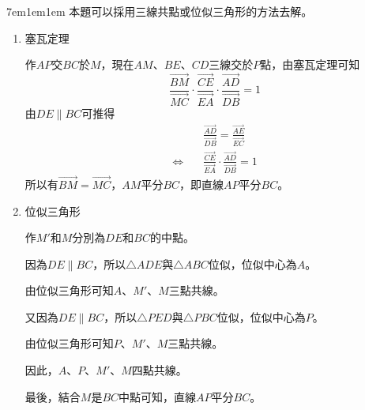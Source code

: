 \documentclass[12pt]{article}
\begin{document}
\begin{mybox}[Answer 7]{7em}{1em}{1em}
    本題可以採用三線共點或位似三角形的方法去解。
    \begin{enumerate}[label = 方法 \arabic*：]
        \item 塞瓦定理
        
        作$AP$交$BC$於$M$，現在$AM$、$BE$、$CD$三線交於$P$點，由塞瓦定理可知
        $$
            \frac{\overrightarrow{BM}}{\overrightarrow{MC}}
            \cdot\frac{\overrightarrow{CE}}{\overrightarrow{EA}}
            \cdot\frac{\overrightarrow{AD}}{\overrightarrow{DB}}=1
        $$
        由$DE\parallel BC$可推得
        \begin{align*}
            &\frac{\overrightarrow{AD}}{\overrightarrow{DB}}=\frac{\overrightarrow{AE}}{\overrightarrow{EC}}\\
            \Leftrightarrow\quad&\frac{\overrightarrow{CE}}{\overrightarrow{EA}}
            \cdot\frac{\overrightarrow{AD}}{\overrightarrow{DB}}=1
        \end{align*}
        所以有$\overrightarrow{BM}=\overrightarrow{MC}$，$AM$平分$BC$，即直線$AP$平分$BC$。
        \item 位似三角形
        \begin{figure}[H]
            \centering
        \end{figure}
        作$M'$和$M$分別為$DE$和$BC$的中點。
        
        因為$DE\parallel BC$，所以$\triangle{ADE}$與$\triangle{ABC}$位似，位似中心為$A$。

        由位似三角形可知$A$、$M'$、$M$三點共線。

        又因為$DE\parallel BC$，所以$\triangle{PED}$與$\triangle{PBC}$位似，位似中心為$P$。
        
        由位似三角形可知$P$、$M'$、$M$三點共線。

        因此，$A$、$P$、$M'$、$M$四點共線。
        
        最後，結合$M$是$BC$中點可知，直線$AP$平分$BC$。
    \end{enumerate}
    
\end{mybox}
\end{document}
